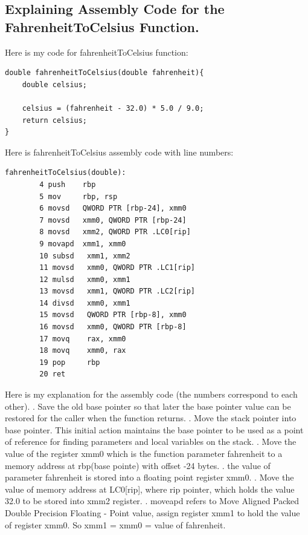 \documentclass{article}
\theoremstyle{theorem}
\theoremstyle{definition}
\theoremstyle{remark}
\begin{document}
\subsection{Explaining Assembly Code for the FahrenheitToCelsius Function.}
Here is my code for fahrenheitToCelsius function:
\begin{lstlisting}
double fahrenheitToCelsius(double fahrenheit){
    double celsius;
 
    celsius = (fahrenheit - 32.0) * 5.0 / 9.0;
    return celsius;
}
\end{lstlisting}
 Here is fahrenheitToCelsius assembly code with line numbers:
\begin{lstlisting}
fahrenheitToCelsius(double):
        4 push    rbp
        5 mov     rbp, rsp
        6 movsd   QWORD PTR [rbp-24], xmm0
        7 movsd   xmm0, QWORD PTR [rbp-24]
        8 movsd   xmm2, QWORD PTR .LC0[rip]
        9 movapd  xmm1, xmm0
        10 subsd   xmm1, xmm2
        11 movsd   xmm0, QWORD PTR .LC1[rip]
        12 mulsd   xmm0, xmm1
        13 movsd   xmm1, QWORD PTR .LC2[rip]
        14 divsd   xmm0, xmm1
        15 movsd   QWORD PTR [rbp-8], xmm0
        16 movsd   xmm0, QWORD PTR [rbp-8]
        17 movq    rax, xmm0
        18 movq    xmm0, rax
        19 pop     rbp
        20 ret
\end{lstlisting}
Here is my explanation for the assembly code (the numbers correspond to each other).
\newline {}. Save the old base pointer so that later the base pointer value can be restored for the caller when the function returns.
\newline {}. Move the stack pointer into base pointer. This initial action maintains the base pointer to be used as a point of reference for finding parameters and local variables on the stack.
\newline {}. Move the value of the register xmm0 which is the function parameter fahrenheit to a memory address at rbp(base pointe) with offset -24 bytes. 
\newline {}. the value of parameter fahrenheit is stored into a floating point register xmm0.
\newline {}. Move the value of memory address at LC0[rip], where rip pointer, which holds the value 32.0 to be stored into xmm2 register.
\newline {}. moveapd refers to Move Aligned Packed Double Precision Floating - Point value, assign register xmm1 to hold the value of register xmm0. So xmm1 = xmm0 = value of fahrenheit. 
\end{document}
